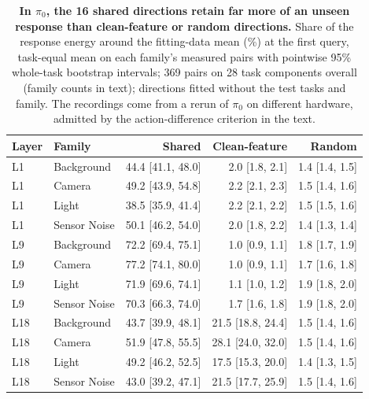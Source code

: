 \begin{table}[t]\centering\small
\caption{\textbf{In $\pi_0$, the 16 shared directions retain far more of an unseen response than clean-feature or random directions.} Share of the response energy around the fitting-data mean (\%) at the first query, task-equal mean on each family's measured pairs with pointwise 95\% whole-task bootstrap intervals; 369 pairs on 28 task components overall (family counts in text); directions fitted without the test tasks and family. The recordings come from a rerun of $\pi_0$ on different hardware, admitted by the action-difference criterion in the text.}
\label{tab:pi0-retention}
\begin{tabular}{llrrr}\toprule
Layer & Family & Shared & Clean-feature & Random\\\midrule
L1 & Background & 44.4 [41.1, 48.0] & 2.0 [1.8, 2.1] & 1.4 [1.4, 1.5]\\
L1 & Camera & 49.2 [43.9, 54.8] & 2.2 [2.1, 2.3] & 1.5 [1.4, 1.6]\\
L1 & Light & 38.5 [35.9, 41.4] & 2.2 [2.1, 2.2] & 1.5 [1.5, 1.6]\\
L1 & Sensor Noise & 50.1 [46.2, 54.0] & 2.0 [1.8, 2.2] & 1.4 [1.3, 1.4]\\
L9 & Background & 72.2 [69.4, 75.1] & 1.0 [0.9, 1.1] & 1.8 [1.7, 1.9]\\
L9 & Camera & 77.2 [74.1, 80.0] & 1.0 [0.9, 1.1] & 1.7 [1.6, 1.8]\\
L9 & Light & 71.9 [69.6, 74.1] & 1.1 [1.0, 1.2] & 1.9 [1.8, 2.0]\\
L9 & Sensor Noise & 70.3 [66.3, 74.0] & 1.7 [1.6, 1.8] & 1.9 [1.8, 2.0]\\
L18 & Background & 43.7 [39.9, 48.1] & 21.5 [18.8, 24.4] & 1.5 [1.4, 1.6]\\
L18 & Camera & 51.9 [47.8, 55.5] & 28.1 [24.0, 32.0] & 1.5 [1.4, 1.6]\\
L18 & Light & 49.2 [46.2, 52.5] & 17.5 [15.3, 20.0] & 1.4 [1.3, 1.5]\\
L18 & Sensor Noise & 43.0 [39.2, 47.1] & 21.5 [17.7, 25.9] & 1.5 [1.4, 1.6]\\\bottomrule
\end{tabular}
\end{table}
